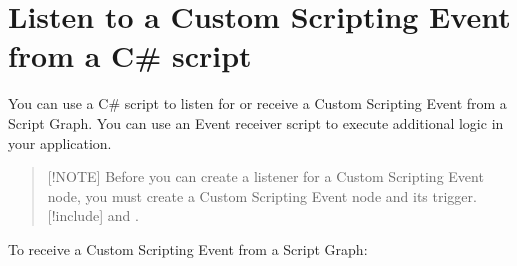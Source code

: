 \chapter{Listen to a Custom Scripting Event from a C\# script}
\hypertarget{md__library_2_package_cache_2com_8unity_8visualscripting_0d1_89_82_2_documentation_0i_2vs-create-own-custom-event-listen-code}{}\label{md__library_2_package_cache_2com_8unity_8visualscripting_0d1_89_82_2_documentation_0i_2vs-create-own-custom-event-listen-code}
\label{md__library_2_package_cache_2com_8unity_8visualscripting_0d1_89_82_2_documentation_0i_2vs-create-own-custom-event-listen-code_autotoc_md1790}%
%
 You can use a C\# script to listen for or receive a Custom Scripting Event from a Script Graph. You can use an Event receiver script to execute additional logic in your application.

\begin{quote}
\mbox{[}!\+NOTE\mbox{]} Before you can create a listener for a Custom Scripting Event node, you must create a Custom Scripting Event node and its trigger. \mbox{[}!include\mbox{]} and . \end{quote}


To receive a Custom Scripting Event from a Script Graph\+:


